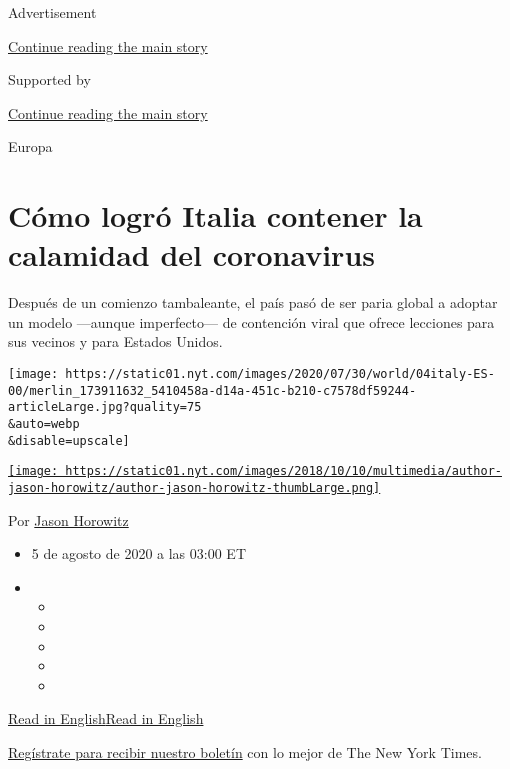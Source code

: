 Advertisement

\protect\hyperlink{after-top}{Continue reading the main story}

Supported by

\protect\hyperlink{after-sponsor}{Continue reading the main story}

Europa

\hypertarget{cuxf3mo-logruxf3-italia-contener-la-calamidad-del-coronavirus}{%
\section{Cómo logró Italia contener la calamidad del
coronavirus}\label{cuxf3mo-logruxf3-italia-contener-la-calamidad-del-coronavirus}}

Después de un comienzo tambaleante, el país pasó de ser paria global a
adoptar un modelo ---aunque imperfecto--- de contención viral que ofrece
lecciones para sus vecinos y para Estados Unidos.

\texttt{[image: https://static01.nyt.com/images/2020/07/30/world/04italy-ES-00/merlin\_173911632\_5410458a-d14a-451c-b210-c7578df59244-articleLarge.jpg?quality=75\\\&auto=webp\\\&disable=upscale]}

\href{https://www.nytimes.com/by/jason-horowitz}{\texttt{[image: https://static01.nyt.com/images/2018/10/10/multimedia/author-jason-horowitz/author-jason-horowitz-thumbLarge.png]}}

Por \href{https://www.nytimes.com/by/jason-horowitz}{Jason Horowitz}

\begin{itemize}
\item
  5 de agosto de 2020 a las 03:00 ET
\item
  \begin{itemize}
  \item
  \item
  \item
  \item
  \item
  \end{itemize}
\end{itemize}

\href{https://www.nytimes.com/2020/07/31/world/europe/italy-coronavirus-reopening.html}{Read
in
English}\href{https://www.nytimes.com/2020/07/31/world/europe/italy-coronavirus-reopening.html}{Read
in English}

\href{https://www.nytimes.com/newsletters/el-times}{Regístrate para
recibir nuestro boletín} con lo mejor de The New York Times.

